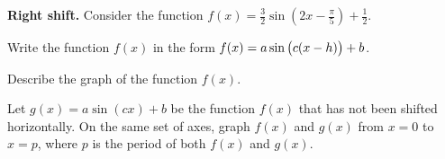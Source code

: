 \documentclass[a4paper,oneside,12pt]{article}
\begin{document}
\begin{example}
\textbf{Right shift.}
Consider the function
$f(x) = \frac{3}{2} \sin(2x - \frac{\pi}{5}) + \frac{1}{2}$.
\begin{packedenum}
\item\label{subeg:trigonometric:sin_right_shift_pi_10}
  Write the function $f(x)$ in the form
  $f(x) = a \sin\big(c (x - h)\big) + b$.

\item\label{subeg:trigonometric:sin_right_shift_pi_10_describe}
  Describe the graph of the function $f(x)$.

\item\label{subeg:trigonometric:sin_right_shift_pi_10_graph}
  Let $g(x) = a \sin(cx) + b$ be the function $f(x)$ that has not been
  shifted horizontally.  On the same set of axes, graph $f(x)$ and
  $g(x)$ from $x = 0$ to $x = p$, where $p$ is the period of both
  $f(x)$ and $g(x)$.
\end{packedenum}
\end{example}
\end{document}
